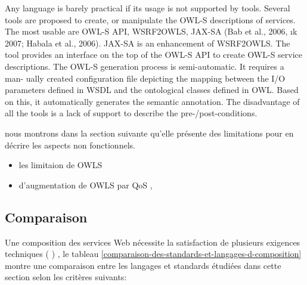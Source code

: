 {      Any language is barely practical if its usage is not supported
      by tools. Several tools are proposed to create, or manipulate
      the OWL-S descriptions of services.  The most usable are OWL-S
      API, WSRF2OWLS, JAX-SA (Bab  et al., 2006, ık 2007; Habala et
      al., 2006). JAX-SA is an enhancement of WSRF2OWLS. The tool
      provides an interface on the top of the OWL-S API to create
      OWL-S service descriptions. The OWL-S generation process is
      semi-automatic. It requires a man- ually created configuration
      file depicting the mapping between the I/O parameters defined in
      WSDL and the ontological classes defined in OWL. Based on this,
      it automatically generates the semantic annotation. The
      disadvantage of all the tools is a lack of support to describe
      the pre-/post-conditions.\cite{bartalos2011effective}

      nous montrons dans la section suivante qu’elle présente des
      limitations pour en décrire les aspects non
      fonctionnels.\cite{jean2012prise}

      \begin{itemize}
        \item les limitaion de OWLS \cite{jean2012prise}
        \item d'augmentation de OWLS par QoS \cite{baryannis2010},
          \cite{kritikos2009requirements}
      \end{itemize}
    }


    \subsection{Comparaison}
    \label{sec:langs-comparaison}   
    Une composition des services Web nécessite la satisfaction de
    plusieurs exigences techniques (\cite{sheng2014web}
    \cite{bucchiarone2006survey}) , le tableau
    \ref{comparaison-des-standards-et-langages-d-composition} montre
    une comparaison entre les langages et standards étudiées dans
    cette section selon les critères suivants:
    


